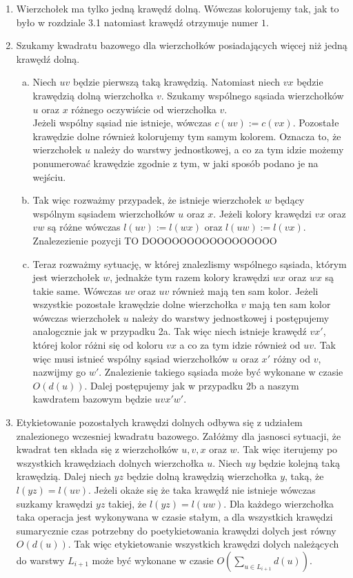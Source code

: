 \documentclass[12pt,a4paper,titlepage]{article}
\begin{document}
\begin{enumerate}
\item Wierzchołek ma tylko jedną krawędź dolną. Wówczas kolorujemy tak, jak to było w rozdziale 3.1 natomiast krawędź otrzymuje numer $1$. 
\item Szukamy kwadratu bazowego dla wierzchołków posiadających więcej niż jedną krawędź dolną. 
\begin{enumerate}[a)]
\item
Niech $uv$ będzie pierwszą taką krawędzią. Natomiast niech $vx$ będzie krawędzią dolną wierzchołka $v$. Szukamy wspólnego sąsiada wierzchołków $u$ oraz $x$ różnego oczywiście od wierzchołka $v$. \\
Jeżeli wspólny sąsiad nie istnieje, wówczas $c(uv):=c(vx)$. Pozostałe krawędzie dolne również kolorujemy tym samym kolorem. Oznacza to, że wierzchołek $u$ należy do warstwy jednostkowej, a co za tym idzie możemy ponumerować krawędzie zgodnie z tym, w jaki sposób podano je na wejściu.\\
\item Tak więc rozważmy przypadek, że istnieje wierzchołek $w$ będący wspólnym sąsiadem wierzchołków $u$ oraz $x$. Jeżeli kolory krawędzi $vx$ oraz $vw$ są różne wówczas $l(uv):=l(wx)$ oraz $l(uw):=l(vx)$. Znalezezienie pozycji TO DOOOOOOOOOOOOOOOOO\\
\item
Teraz rozważmy sytuację, w której znalezlismy wspólnego sąsiada, którym jest wierzchołek $w$, jednakże tym razem kolory krawędzi $wx$ oraz $wx$ są takie same. Wówczas $uv$ oraz $uv$ również mają ten sam kolor. Jeżeli wszystkie pozostałe krawędzie dolne wierzchołka $v$ mają ten sam kolor wówczas wierzchołek $u$ należy do warstwy jednostkowej i postępujemy analogcznie jak w przypadku 2a. Tak więc niech istnieje krawędź $vx'$, której kolor różni się od koloru $vx$ a co za tym idzie również od $uv$. Tak więc musi istnieć wspólny sąsiad wierzchołków $u$ oraz $x'$ różny od $v$, nazwijmy go $w'$. Znalezienie takiego sąsiada może być wykonane w czasie $O(d(u))$. Dalej postępujemy jak w przypadku 2b a naszym kawdratem bazowym będzie $uvx'w'$.
\end{enumerate} 
\item
Etykietowanie pozostałych krawędzi dolnych odbywa się z udziałem znalezionego wczesniej kwadratu bazowego. Załóżmy dla jasnosci sytuacji, że kwadrat ten składa się z wierzchołków $u,v,x$ oraz $w$. Tak więc iterujemy po wszystkich krawędziach dolnych wierzchołka $u$. Niech $uy$ będzie kolejną taką krawędzią. Dalej niech $yz$ będzie dolną krawędzią wierzchołka $y$, taką, że $l(yz)=l(uv)$. Jeżeli okaże się że taka krawędź nie istnieje wówczas suzkamy krawędzi $yz$ takiej, że $l(yz)=l(uw)$. Dla każdego wierzchołka taka operacja jest wykonywana w czasie stałym, a dla wszystkich krawędzi sumarycznie czas potrzebny do poetykietowania krawędzi dolych jest równy $O(d(u))$. Tak więc etykietowanie wszystkich krawędzi dolych należących do warstwy $L_{i+1}$ może być wykonane w czasie $O(\sum_{u \in L_{i+1}}d(u))$.\\

\end{enumerate}
\end{document}

